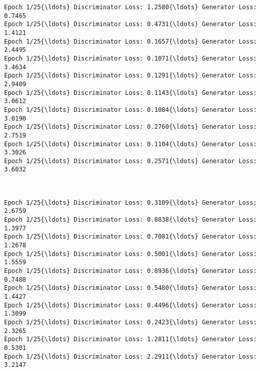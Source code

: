 \documentclass[11pt]{article}
\begin{document}
    \begin{Verbatim}[commandchars=\\\{\}]
Epoch 1/25{\ldots} Discriminator Loss: 1.2580{\ldots} Generator Loss: 0.7465
Epoch 1/25{\ldots} Discriminator Loss: 0.4731{\ldots} Generator Loss: 1.4121
Epoch 1/25{\ldots} Discriminator Loss: 0.1657{\ldots} Generator Loss: 2.4495
Epoch 1/25{\ldots} Discriminator Loss: 0.1071{\ldots} Generator Loss: 3.4634
Epoch 1/25{\ldots} Discriminator Loss: 0.1291{\ldots} Generator Loss: 2.9409
Epoch 1/25{\ldots} Discriminator Loss: 0.1143{\ldots} Generator Loss: 3.0612
Epoch 1/25{\ldots} Discriminator Loss: 0.1084{\ldots} Generator Loss: 3.0190
Epoch 1/25{\ldots} Discriminator Loss: 0.2760{\ldots} Generator Loss: 2.7519
Epoch 1/25{\ldots} Discriminator Loss: 0.1104{\ldots} Generator Loss: 3.3026
Epoch 1/25{\ldots} Discriminator Loss: 0.2571{\ldots} Generator Loss: 3.6032

    \end{Verbatim}

    \begin{center}
    \end{center}
    { \hspace*{\fill} \\}
    
    \begin{Verbatim}[commandchars=\\\{\}]
Epoch 1/25{\ldots} Discriminator Loss: 0.3109{\ldots} Generator Loss: 2.6759
Epoch 1/25{\ldots} Discriminator Loss: 0.8838{\ldots} Generator Loss: 1.3977
Epoch 1/25{\ldots} Discriminator Loss: 0.7081{\ldots} Generator Loss: 1.2678
Epoch 1/25{\ldots} Discriminator Loss: 0.5001{\ldots} Generator Loss: 1.5559
Epoch 1/25{\ldots} Discriminator Loss: 0.8936{\ldots} Generator Loss: 0.7488
Epoch 1/25{\ldots} Discriminator Loss: 0.5480{\ldots} Generator Loss: 1.4427
Epoch 1/25{\ldots} Discriminator Loss: 0.4496{\ldots} Generator Loss: 1.3099
Epoch 1/25{\ldots} Discriminator Loss: 0.2423{\ldots} Generator Loss: 2.3265
Epoch 1/25{\ldots} Discriminator Loss: 1.2811{\ldots} Generator Loss: 0.5301
Epoch 1/25{\ldots} Discriminator Loss: 2.2911{\ldots} Generator Loss: 3.2147

    \end{Verbatim}

    \begin{center}
    \end{center}
    { \hspace*{\fill} \\}
    
\end{document}
